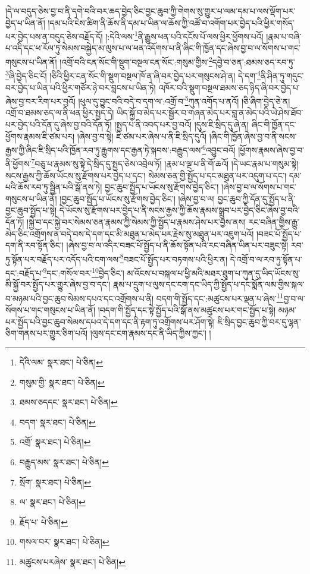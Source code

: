 །དེ་ལ་བདུད་ཅེས་བྱ་བ་ནི་དགེ་བའི་བར་ཆད་བྱེད་ཅིང་བྱང་ཆུབ་ཀྱི་གེགས་སུ་གྱུར་པ་ལམ་དམ་པ་ལས་ལྡོག་པར་བྱེད་པ་ཡིན་ནོ། །དམ་པའི་ངེས་ཚིག་ནི་ཆོས་ནི་དམ་པ་ཡིན་ལ་ཆོས་ཀྱི་འཚོ་བ་འགོག་པར་བྱེད་པའི་ཕྱིར་གསོད་པར་བྱེད་པས་ན་བདུད་ཅེས་བརྗོད་དོ། །:དེའི་ལས་\footnote{དེའི་ལམ་  སྣར་ཐང་།  པེ་ཅིན། }ནི་རྒྱུས་ཕན་པའི་དངོས་པོ་ལས་ཕྱིར་ཕྱོགས་པའོ། །རྣམ་པ་བཞི་པ་འདི་དང་ཕ་རོལ་ཏུ་སེམས་བསྐྱེད་མ་ལུས་པ་ལ་ཕན་འདོགས་པ་ནི་ཞིང་གི་ཁྱོན་དང་ཞེས་བྱ་བ་ལ་སོགས་པ་གང་གསུངས་པ་ཡིན་ནོ། །འགྲོ་བའི་ངན་སོང་གི་སྡུག་བསྔལ་ངན་སོང་:གསུམ་གྱིས་\footnote{གསུམ་གྱི་  སྣར་ཐང་།  པེ་ཅིན། }དབྱེ་བ་ཅན་:ཐམས་ཅད་རབ་ཏུ་\footnote{ཐམས་ཅདདང་  སྣར་ཐང་།  པེ་ཅིན། }ཞི་བྱེད་ཅིང་ངོ། །ཅིའི་ཕྱིར་ངན་སོང་གི་སྡུག་བསྔལ་ཁོ་ན་ཞི་བར་བྱེད་པར་གསུངས་ཤེ་ན། དེ་དག་\footnote{བདག་  སྣར་ཐང་།  པེ་ཅིན། }ནི་ཤིན་ཏུ་གདུང་བར་བྱེད་པ་ཡིན་པའི་ཕྱིར་གཙོར་ཉེ་བར་བླངས་པ་ཡིན་ཏེ། འཁོར་བའི་སྡུག་བསྔལ་ཐམས་ཅད་ཉིད་ཞི་བར་བྱེད་པ་ཞེས་བྱ་བར་རིག་པར་བྱའོ། །ཕུལ་དུ་བྱུང་བའི་བདེ་བ་དག་ལ་:འགྲོ་བ་\footnote{འགྲོ་  སྣར་ཐང་།  པེ་ཅིན། }ཀུན་འགོད་པ་ནའོ། །ཅི་ཞིག་བྱེད་ཅེ་ན། འགྲོ་བ་ཐམས་ཅད་ལ་ནི་ཕན་ཕྱིར་སྤྱད་དེ། ཡིད་སྐྱོ་བ་མེད་པར་སྦྱོར་བ་གཞན་མེད་པར་བླ་ན་མེད་པའི་ཡེ་ཤེས་ཐོབ་པར་བྱེད་པའི་དོན་དུ་ཞེས་བྱ་བའི་དོན་ཏོ། །སྤྱད་པ་ནི་འབད་པར་བྱ་བའོ། །དུས་ཇི་སྲིད་དུ་ཞེ་ན། ཞིང་གི་ཁྱོན་དང་ཕྱོགས་རྣམས་ཇི་ཙམ་པར། །ཞེས་བྱ་བ་སྟེ། ཇི་ཙམ་པར་ཞེས་པ་ནི་ཇི་སྲིད་དུའོ། །ཞིང་གི་ཁྱོན་ཞེས་བྱ་བ་ནི་སངས་རྒྱས་ཀྱི་ཞིང་ཇི་སྲིད་པའི་ཁྱོན་རབ་ཏུ་རྒྱུགས་དང་རྒྱན་ཏེ་སྐབས་:བརྒྱུད་ལས་\footnote{བརྒྱུད་མས་  སྣར་ཐང་།  པེ་ཅིན། }འབྱུང་བའོ། །ཕྱོགས་རྣམས་ཞེས་བྱ་བ་ནི་ཕྱོགས་\footnote{སྲོག་  སྣར་ཐང་།  པེ་ཅིན། }བཅུ་པ་རྣམས་སུ་སྟེ་དེ་སྲིད་དུ་སྤྱད་ཅེས་འབྲེལ་ཏོ། །རྣམ་པ་ལྔ་པ་ནི་གོ་ཆའོ། །དེ་ཡང་རྣམ་པ་གསུམ་སྟེ། སངས་རྒྱས་ཀྱི་ཆོས་ཡོངས་སུ་རྫོགས་པར་བྱེད་པ་དང་། སེམས་ཅན་གྱི་སྤྱོད་པ་དང་མཐུན་པར་འདུག་པ་དང་། དམ་པའི་ཆོས་རབ་ཏུ་སྦྱིན་པའི་སྒོ་ནས་ཏེ། བྱང་ཆུབ་སྤྱོད་པ་ཡོངས་སུ་རྫོགས་བྱེད་ཅིང་། །ཞེས་བྱ་བ་ལ་སོགས་པ་གང་གསུངས་པ་ཡིན་ནོ། །བྱང་ཆུབ་སྤྱོད་པ་ཡོངས་སུ་རྫོགས་བྱེད་ཅིང་། །ཞེས་བྱ་བ་ལ། བྱང་ཆུབ་ཀྱི་དོན་དུ་སྤྱོད་པ་ནི་བྱང་ཆུབ་སྤྱོད་པ་སྟེ། དེ་ཡོངས་སུ་རྫོགས་པར་བྱེད་པ་ནི་སངས་རྒྱས་ཀྱི་ཆོས་རྣམས་སྒྲུབ་པར་བྱེད་ཅིང་ཞེས་བྱ་བའི་དོན་ཏོ། །སྐྱེ་བ་དང་སྐྱེ་བར་སེམས་ཅན་རྣམས་ཀྱི་སེམས་ཀྱི་སྤྱོད་པ་རྣམས་ཤེས་པར་བྱས་ནས། རང་བཞིན་གྱིས་རྒྱུ་མེད་ཅིང་འགྲོགས་ན་བདེ་བས་དེ་དག་དང་མི་མཐུན་པ་མེད་པར་རྗེས་སུ་མཐུན་པར་འཇུག་པའོ། །བཟང་པོ་སྤྱོད་པ་དག་ནི་རབ་སྟོན་ཅིང་། །ཞེས་བྱ་བ་ལ་འདིར་བཟང་པོ་སྤྱོད་པ་ནི་ཆོས་སྟོན་པའི་རང་བཞིན་ཡིན་པར་བཟུང་སྟེ། རབ་ཏུ་སྟོན་པར་བརྗོད་པར་འདོད་པའི་ངག་ལས་\footnote{ལ་  སྣར་ཐང་།  པེ་ཅིན། }བཟང་པོ་སྤྱོད་པར་བཏགས་པའི་ཕྱིར་ན། དེ་འགྲོ་བ་ལ་རབ་ཏུ་སྟོན་པ་དང་:བརྗོད་པ་\footnote{རྗོད་པ་  པེ་ཅིན། }དང་:གསོལ་བར་\footnote{གསལ་བར་  སྣར་ཐང་།  པེ་ཅིན། }བྱེད་ཅིང་། མ་འོངས་པ་བསྐལ་པ་ཕྱི་མའི་མཐར་ཐུག་པ་ཀུན་དུ་ཡིད་ཡོངས་སུ་མི་སྐྱོ་བར་སྤྱོད་པར་གྱུར་ཞེས་བྱ་བ་དང་། རྣམ་པ་དྲུག་པ་ལུས་དང་ངག་དང་ཡིད་ཀྱི་སྤྱོད་པ་དང་སྨོན་ལམ་གྱིས་སྐལ་བ་མཉམ་པའི་བྱང་ཆུབ་སེམས་དཔའ་དང་འགྲོགས་པ་ནི། བདག་གི་སྤྱོད་དང་:མཚུངས་པར་ལྡན་པ་ཞེས་\footnote{མཚུངས་པརཞེས་  སྣར་ཐང་།  པེ་ཅིན། }བྱ་བ་ལ་སོགས་པ་གང་གསུངས་པ་ཡིན་ནོ། །བདག་གི་སྤྱོད་དང་སྟེ་སྤྱོད་པའི་སྒོ་ནས་མཚུངས་པར་གང་སྤྱོད་པ་སྟེ། མཉམ་པར་སྤྱོད་པའི་བྱང་ཆུབ་སེམས་དཔའ་དེ་དག་དང་ནི་རྟག་ཏུ་འགྲོགས་པར་ཤོག་སྟེ། ཇི་སྲིད་བྱང་ཆུབ་ཀྱི་བར་དུ་ལྷན་ཅིག་གནས་པར་གྱུར་ཅིག་པའོ། །ལུས་དང་ངག་རྣམས་དང་ནི་ཡིད་ཀྱིས་ཀྱང་། །
